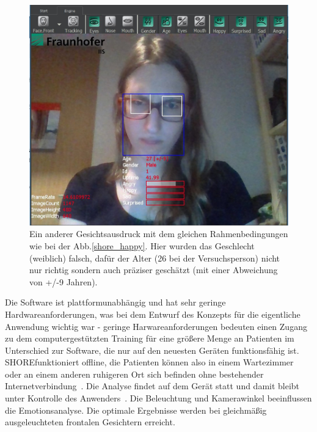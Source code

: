 \begin{figure}[!ht]
\centering\includegraphics[width=330pt]{texes/shore_angry.png}
\caption{Ein anderer Gesichtsausdruck mit dem gleichen Rahmenbedingungen wie bei der Abb.\ref{shore_happy}. Hier wurden das Geschlecht (weiblich) falsch, dafür der Alter (26 bei der Versuchsperson) nicht nur richtig sondern auch präziser geschätzt (mit einer Abweichung von +/-9 Jahren).}
\label{shore_angry}
\end{figure}

Die Software ist plattformunabhängig und hat sehr geringe \\Hardwareanforderungen, was bei dem Entwurf des Konzepts für die eigentliche Anwendung wichtig war - geringe Harwareanforderungen bedeuten einen Zugang zu dem computergestützten Training für eine größere Menge an Patienten im Unterschied zur Software, die nur auf den neuesten Geräten funktionsfähig ist. SHORE\re funktioniert offline, die Patienten können also in einem Wartezimmer oder an einem anderen ruhigeren Ort sich befinden ohne bestehender Internetverbindung~\cite{shore}. 
Die Analyse findet auf dem Gerät statt und damit bleibt unter Kontrolle des Anwenders~\cite{shore_datenschutz}.
Die Beleuchtung und Kamerawinkel beeinflussen die Emotionsanalyse. Die optimale Ergebnisse werden bei gleichmäßig ausgeleuchteten frontalen Gesichtern erreicht.

